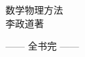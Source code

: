 \documentclass[11pt,a4paper,twoside,openright]{ctexbook}
\begin{document}
\begin{titlepage}
\thispagestyle{empty}
\centering
\vspace*{3.5cm}
{\heiti 数学物理方法}\\[2.2em]
{\kaishu 李政道\quad 著}
\vfill
\end{titlepage}

\thispagestyle{empty}\mbox{}\clearpage

\frontmatter
\tableofcontents

\mainmatter















\vfill
\begin{center}\kaishu —— 全书完 ——\end{center}
\end{document}
